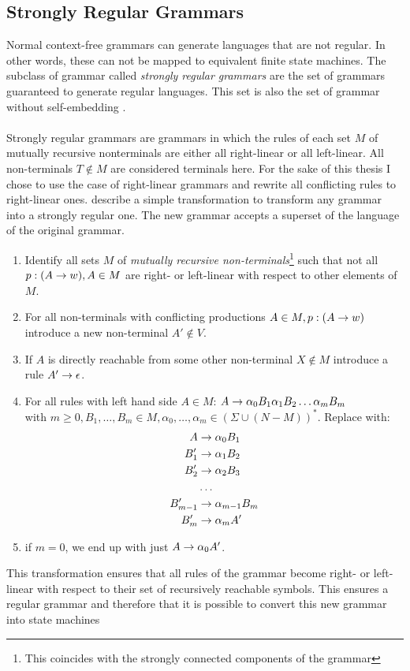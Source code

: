 	\subsection{Strongly Regular Grammars}
	\label{sec:MohriNederhof}
	Normal context-free grammars can generate languages that are not regular. In other words, these can not be mapped to equivalent finite state machines. The subclass of grammar called \emph{strongly regular grammars} are the set of grammars guaranteed to generate regular languages. This set is also the set of grammar without self-embedding \parencite{Chomsky1959}.\\\\
	Strongly regular grammars are grammars in which the rules of each set $M$ of mutually recursive nonterminals are either all right-linear or all left-linear. All non-terminals $T \not \in M$ are considered terminals here. For the sake of this thesis I chose to use the case of right-linear grammars and rewrite all conflicting rules to right-linear ones. \cite{MohriNederhof} describe a simple transformation to transform any grammar into a strongly regular one. The new grammar accepts a superset of the language of the original grammar.
	\pagebreak
	\begin{enumerate}
		\item Identify all sets $M$ of \textit{mutually recursive non-terminals}\footnote{This coincides with the strongly connected components of the grammar} such that not all\\ $p:(A \rightarrow w), A \in M$ are right- or left-linear with respect to other elements of $M$.
		\item For all non-terminals with conflicting productions $A \in M, p:(A \rightarrow w)$ introduce a new non-terminal $A' \not \in V$. 
		\item If $A$ is directly reachable from some other non-terminal $X \not \in M$ introduce a rule $A' \rightarrow \epsilon$.
		\item For all rules with left hand side $A \in M$:
		\subitem $\prodgr{A}{\alpha_0 B_1 \alpha_1 B_2 \dots \alpha_m B_m}\vspace{0.1in}$\\
		with $m \geq 0, B_1, \dots, B_m \in M, \alpha_0, \ldots, \alpha_m \in (\Sigma \cup (N - M))^*$. Replace with:
		\begin{align}
		\nonumber A &\rightarrow \alpha_0 B_1
		\\\nonumber B'_1 &\rightarrow \alpha_1 B_2
		\\\nonumber B'_2 &\rightarrow \alpha_2 B_3
		\\\nonumber &\ldots
		\\\nonumber B'_{m-1} &\rightarrow \alpha_{m-1} B_m
		\\\nonumber B'_m &\rightarrow \alpha_m A'
		\end{align}
		\item if $m = 0$, we end up with just $A \rightarrow \alpha_0 A'$.					
	\end{enumerate}
	This transformation ensures that all rules of the grammar become right- or left-linear with respect to their set of recursively reachable symbols. This ensures a regular grammar and therefore that it is possible to convert this new grammar into state machines

